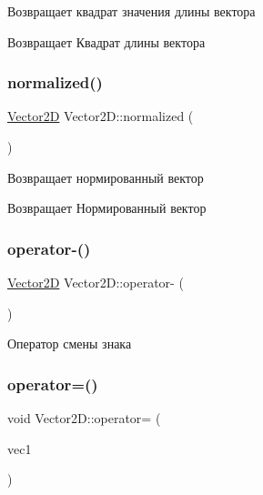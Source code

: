 Возвращает квадрат значения длины вектора \begin{DoxyReturn}{Возвращает}
Квадрат длины вектора 
\end{DoxyReturn}
\mbox{\label{class_vector2_d_a37ab07daec20b3bbdf8742cb8799f291}} 
\subsubsection{\texorpdfstring{normalized()}{normalized()}}
{\footnotesize\ttfamily \mbox{\hyperlink{class_vector2_d}{Vector2D}} Vector2\+D\+::normalized (\begin{DoxyParamCaption}{ }\end{DoxyParamCaption})}

Возвращает нормированный вектор \begin{DoxyReturn}{Возвращает}
Нормированный вектор 
\end{DoxyReturn}
\mbox{\label{class_vector2_d_a4eb1b4403004c8632bb2468cf1942ea5}} 
\subsubsection{\texorpdfstring{operator-\/()}{operator-()}}
{\footnotesize\ttfamily \mbox{\hyperlink{class_vector2_d}{Vector2D}} Vector2\+D\+::operator-\/ (\begin{DoxyParamCaption}{ }\end{DoxyParamCaption})}

Оператор смены знака \mbox{\label{class_vector2_d_a7966363669d4914b5554d5a8e93ea7d3}} 
\subsubsection{\texorpdfstring{operator=()}{operator=()}}
{\footnotesize\ttfamily void Vector2\+D\+::operator= (\begin{DoxyParamCaption}\item[{const \mbox{\hyperlink{class_vector2_d}{Vector2D}} \&}]{vec1 }\end{DoxyParamCaption})}


